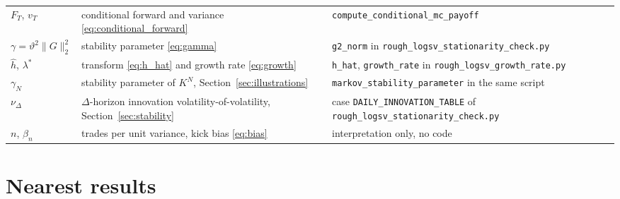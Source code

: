 \begin{table}
{\begin{tabular}{p{2.6cm}p{5.2cm}p{6.2cm}}
$F_T$, $v_T$ & conditional forward and variance \eqref{eq:conditional_forward} & \texttt{compute\_conditional\_mc\_payoff} \\
$\gamma=\vartheta^2\|G\|_2^2$ & stability parameter \eqref{eq:gamma} & \texttt{g2\_norm} in \texttt{rough\_logsv\_stationarity\_check.py} \\
$\widehat h$, $\lambda^*$ & transform \eqref{eq:h_hat} and growth rate \eqref{eq:growth} & \texttt{h\_hat}, \texttt{growth\_rate} in \texttt{rough\_logsv\_growth\_rate.py} \\
$\gamma_N$ & stability parameter of $K^N$, Section~\ref{sec:illustrations} & \texttt{markov\_stability\_parameter} in the same script \\
$\nu_\Delta$ & $\Delta$-horizon innovation volatility-of-volatility, Section~\ref{sec:stability} & case \texttt{DAILY\_INNOVATION\_TABLE} of \texttt{rough\_logsv\_stationarity\_check.py} \\
$n$, $\beta_n$ & trades per unit variance, kick bias \eqref{eq:bias} & interpretation only, no code \\
\bottomrule
\end{tabular}}
\label{tab:notation}
\end{table}

\section{Nearest results}\label{app:nearest}


